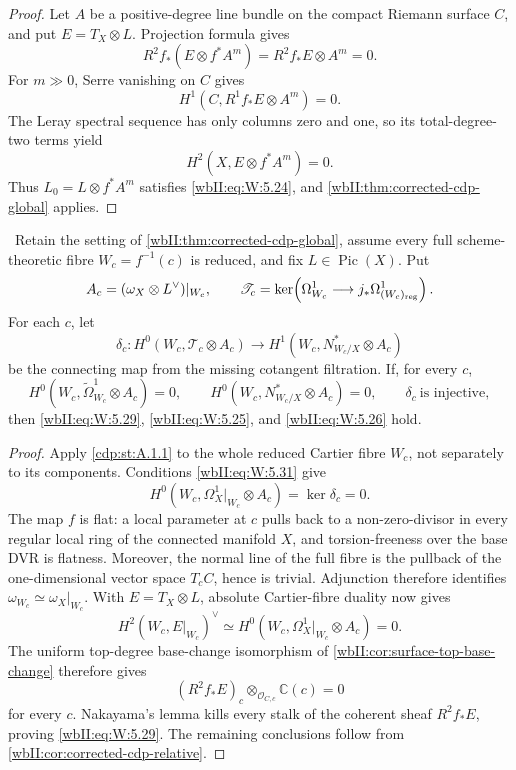 \begin{proof}
Let \(A\) be a positive-degree line bundle on the compact Riemann surface
\(C\), and put \(E=T_X\otimes L\).  Projection formula gives
\[
 R^2f_*(E\otimes f^*A^m)=R^2f_*E\otimes A^m=0.
\]
For \(m\gg0\), Serre vanishing on \(C\) gives
\[
 H^1(C,R^1f_*E\otimes A^m)=0.
\]
The Leray spectral sequence has only columns zero and one, so its
total-degree-two terms yield
\[
 H^2(X,E\otimes f^*A^m)=0.
\]
Thus \(L_0=L\otimes f^*A^m\) satisfies \eqref{wbII:eq:W:5.24}, and
\cref{wbII:thm:corrected-cdp-global} applies.
\end{proof}

\begin{theorem}
\label{wbII:thm:corrected-cdp-fibrewise}
\ Retain the setting of
\cref{wbII:thm:corrected-cdp-global}, assume every full scheme-theoretic fibre
\(W_c=f^{-1}(c)\) is reduced, and fix \(L\in\operatorname{Pic}(X)\).  Put
\[
 A_c=(\omega_X\otimes L^\vee)|_{W_c},\qquad
 \mathscr T_c=\ker\!\left(
 \Omega^1_{W_c}\longrightarrow
 j_*\Omega^1_{(W_c)_{\rm reg}}\right).
\]
For each \(c\), let
\[
 \delta_c:
 H^0(W_c,\mathscr T_c\otimes A_c)
 \longrightarrow
 H^1(W_c,N^*_{W_c/X}\otimes A_c)
\tag{W.57}\label{wbII:eq:W:5.30}
\]
be the connecting map from the missing cotangent filtration.  If, for every
\(c\),
\[
 H^0(W_c,\widetilde\Omega^1_{W_c}\otimes A_c)=0,\qquad
 H^0(W_c,N^*_{W_c/X}\otimes A_c)=0,\qquad
 \delta_c\ \text{is injective},
\tag{W.58}\label{wbII:eq:W:5.31}
\]
then \eqref{wbII:eq:W:5.29}, \eqref{wbII:eq:W:5.25}, and \eqref{wbII:eq:W:5.26} hold.
\end{theorem}

\begin{proof}
Apply \cref{cdp:st:A.1.1} to the whole reduced
Cartier fibre \(W_c\), not separately to its components.  Conditions \eqref{wbII:eq:W:5.31}
give
\[
 H^0(W_c,\Omega_X^1|_{W_c}\otimes A_c)
 =\ker\delta_c=0.
\tag{W.59}\label{wbII:eq:W:5.32}
\]
The map \(f\) is flat: a local parameter at \(c\) pulls back to a
non-zero-divisor in every regular local ring of the connected manifold \(X\),
and torsion-freeness over the base DVR is flatness.  Moreover, the normal
line of the full fibre is the pullback of the one-dimensional vector space
\(T_cC\), hence is trivial.  Adjunction therefore identifies
\(\omega_{W_c}\simeq\omega_X|_{W_c}\).  With \(E=T_X\otimes L\), absolute
Cartier-fibre duality now gives
\[
 H^2(W_c,E|_{W_c})^\vee
 \simeq H^0(W_c,\Omega_X^1|_{W_c}\otimes A_c)=0.
\]
The uniform top-degree base-change isomorphism of
\cref{wbII:cor:surface-top-base-change} therefore gives
\[
 (R^2f_*E)_c\otimes_{\mathcal O_{C,c}}\mathbb C(c)=0
\]
for every \(c\).  Nakayama's lemma kills every stalk of the coherent sheaf
\(R^2f_*E\), proving \eqref{wbII:eq:W:5.29}.  The remaining conclusions follow from
\cref{wbII:cor:corrected-cdp-relative}.
\end{proof}

